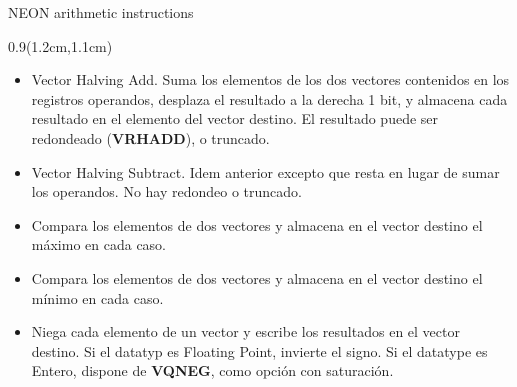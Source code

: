 \begin{frame}{NEON arithmetic instructions}
 \begin{textblock*}{0.9\textwidth}(1.2cm,1.1cm)
  \begin{itemize}\justifying
   \item [VHADD] Vector Halving Add. Suma los elementos de los dos vectores contenidos en los registros operandos, desplaza el resultado a la derecha 1 bit, y almacena cada resultado en el elemento del vector destino. El resultado puede ser redondeado (\textbf{VRHADD}), o truncado.
   \item [VHSUB] Vector Halving Subtract. Idem anterior excepto que resta en lugar de sumar los operandos. No hay redondeo o truncado.
   \item [VMAX] Compara los elementos de dos vectores y almacena en el vector destino el máximo en cada caso.
   \item [VMIN] Compara los elementos de dos vectores y almacena en el vector destino el mínimo en cada caso.
   \item [VNEG] Niega cada elemento de un vector y escribe los resultados en el vector destino. Si el datatyp es Floating Point, invierte el signo. Si el datatype es Entero, dispone de \textbf{VQNEG}, como opción con saturación.
  \end{itemize}
 \end{textblock*}
\end{frame}


